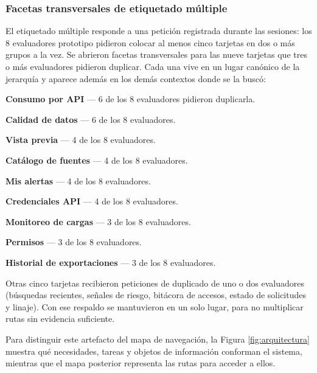 \subsubsection{Facetas transversales de etiquetado múltiple}
El etiquetado múltiple responde a una petición registrada durante las sesiones: los 8 evaluadores prototipo pidieron colocar al menos cinco tarjetas en dos o más grupos a la vez. Se abrieron facetas transversales para las nueve tarjetas que tres o más evaluadores pidieron duplicar. Cada una vive en un lugar canónico de la jerarquía y aparece además en los demás contextos donde se la buscó:

\begin{uxlist}
  \item \textbf{Consumo por API} --- 6 de los 8 evaluadores pidieron duplicarla.
  \item \textbf{Calidad de datos} --- 6 de los 8 evaluadores.
  \item \textbf{Vista previa} --- 4 de los 8 evaluadores.
  \item \textbf{Catálogo de fuentes} --- 4 de los 8 evaluadores.
  \item \textbf{Mis alertas} --- 4 de los 8 evaluadores.
  \item \textbf{Credenciales API} --- 4 de los 8 evaluadores.
  \item \textbf{Monitoreo de cargas} --- 3 de los 8 evaluadores.
  \item \textbf{Permisos} --- 3 de los 8 evaluadores.
  \item \textbf{Historial de exportaciones} --- 3 de los 8 evaluadores.
\end{uxlist}

Otras cinco tarjetas recibieron peticiones de duplicado de uno o dos evaluadores (búsquedas recientes, señales de riesgo, bitácora de accesos, estado de solicitudes y linaje). Con ese respaldo se mantuvieron en un solo lugar, para no multiplicar rutas sin evidencia suficiente.

Para distinguir este artefacto del mapa de navegación, la Figura \ref{fig:arquitectura} muestra qué necesidades, tareas y objetos de información conforman el sistema, mientras que el mapa posterior representa las rutas para acceder a ellos.


